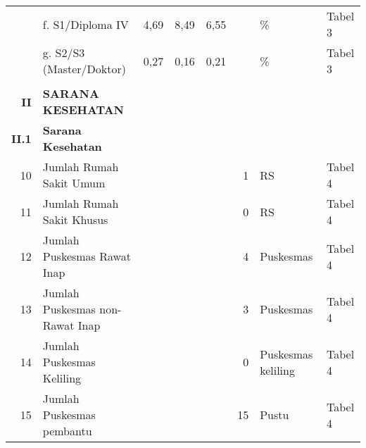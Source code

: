 \begin{small}
\begin{longtable}{rY{12em}rrrrY{5em}Y{5em}}
	                      & f.  S1/Diploma IV                                                                     &   4,69 &   8,49 &    6,55 &                   & \%                             & Tabel 3  \\
	                      & g. S2/S3 (Master/Doktor)                                                              &   0,27 &   0,16 &    0,21 &                   & \%                             & Tabel 3  \\
	                      &                                                                                       &        &        &         &                   &                                &          \\
	          \textbf{II} & \textbf{SARANA KESEHATAN}                                                             &        &        &         &                   &                                &          \\
	        \textbf{II.1} & \textbf{Sarana Kesehatan}                                                             &        &        &         &                   &                                &          \\
	                   10 & Jumlah Rumah Sakit Umum                                                               &        &        &         &                 1 & RS                             & Tabel 4  \\
	 11 & Jumlah Rumah Sakit Khusus                                                             &        &        &         &                 0 & RS                             & Tabel 4  \\
	                   12 & Jumlah Puskesmas Rawat Inap                                                           &        &        &         &                 4 & Puskesmas                      & Tabel 4  \\
	 13 & Jumlah Puskesmas non-Rawat Inap                                                       &        &        &         &                 3 & Puskesmas                      & Tabel 4  \\
	                   14 & Jumlah Puskesmas Keliling                                                             &        &        &         &                 0 & Puskesmas keliling             & Tabel 4  \\
	 15 & Jumlah Puskesmas pembantu                                                             &        &        &         &                15 & Pustu                          & Tabel 4  \\

\end{longtable}
\end{small}
